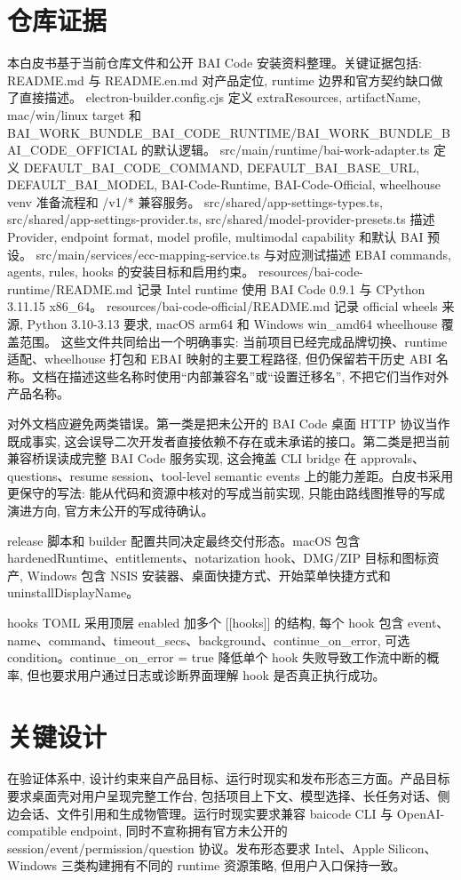 \section{仓库证据}
本白皮书基于当前仓库文件和公开 BAI Code 安装资料整理。关键证据包括: README.md 与 README.en.md 对产品定位, runtime 边界和官方契约缺口做了直接描述。 electron-builder.config.cjs 定义 extraResources, artifactName, mac/win/linux target 和 BAI\_WORK\_BUNDLE\_BAI\_CODE\_RUNTIME/BAI\_WORK\_BUNDLE\_BAI\_CODE\_OFFICIAL 的默认逻辑。 src/main/runtime/bai-work-adapter.ts 定义 DEFAULT\_BAI\_CODE\_COMMAND, DEFAULT\_BAI\_BASE\_URL, DEFAULT\_BAI\_MODEL, BAI-Code-Runtime, BAI-Code-Official, wheelhouse venv 准备流程和 /v1/* 兼容服务。 src/shared/app-settings-types.ts, src/shared/app-settings-provider.ts, src/shared/model-provider-presets.ts 描述 Provider, endpoint format, model profile, multimodal capability 和默认 BAI 预设。 src/main/services/ecc-mapping-service.ts 与对应测试描述 EBAI commands, agents, rules, hooks 的安装目标和启用约束。 resources/bai-code-runtime/README.md 记录 Intel runtime 使用 BAI Code 0.9.1 与 CPython 3.11.15 x86\_64。 resources/bai-code-official/README.md 记录 official wheels 来源, Python 3.10-3.13 要求, macOS arm64 和 Windows win\_amd64 wheelhouse 覆盖范围。 这些文件共同给出一个明确事实: 当前项目已经完成品牌切换、runtime 适配、wheelhouse 打包和 EBAI 映射的主要工程路径, 但仍保留若干历史 ABI 名称。文档在描述这些名称时使用“内部兼容名”或“设置迁移名”, 不把它们当作对外产品名称。

对外文档应避免两类错误。第一类是把未公开的 BAI Code 桌面 HTTP 协议当作既成事实, 这会误导二次开发者直接依赖不存在或未承诺的接口。第二类是把当前兼容桥误读成完整 BAI Code 服务实现, 这会掩盖 CLI bridge 在 approvals、questions、resume session、tool-level semantic events 上的能力差距。白皮书采用更保守的写法: 能从代码和资源中核对的写成当前实现, 只能由路线图推导的写成演进方向, 官方未公开的写成待确认。

release 脚本和 builder 配置共同决定最终交付形态。macOS 包含 hardenedRuntime、entitlements、notarization hook、DMG/ZIP 目标和图标资产, Windows 包含 NSIS 安装器、桌面快捷方式、开始菜单快捷方式和 uninstallDisplayName。

hooks TOML 采用顶层 enabled 加多个 [[hooks]] 的结构, 每个 hook 包含 event、name、command、timeout\_secs、background、continue\_on\_error, 可选 condition。continue\_on\_error = true 降低单个 hook 失败导致工作流中断的概率, 但也要求用户通过日志或诊断界面理解 hook 是否真正执行成功。

\section{关键设计}
在验证体系中, 设计约束来自产品目标、运行时现实和发布形态三方面。产品目标要求桌面壳对用户呈现完整工作台, 包括项目上下文、模型选择、长任务对话、侧边会话、文件引用和生成物管理。运行时现实要求兼容 baicode CLI 与 OpenAI-compatible endpoint, 同时不宣称拥有官方未公开的 session/event/permission/question 协议。发布形态要求 Intel、Apple Silicon、Windows 三类构建拥有不同的 runtime 资源策略, 但用户入口保持一致。

